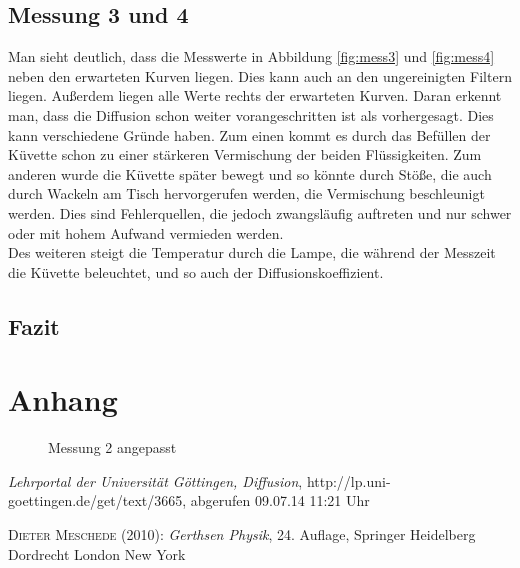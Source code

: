 \documentclass[12pt,a4paper,titlepage,headinclude,bibtotoc]{scrartcl}
\begin{document}
\subsection{Messung 3 und 4}
Man sieht deutlich, dass die Messwerte in Abbildung \ref{fig:mess3} und \ref{fig:mess4} neben den erwarteten Kurven liegen.
Dies kann auch an den ungereinigten Filtern liegen.
Außerdem liegen alle Werte rechts der erwarteten Kurven.
Daran erkennt man, dass die Diffusion schon weiter vorangeschritten ist als vorhergesagt.
Dies kann verschiedene Gründe haben.
Zum einen kommt es durch das Befüllen der Küvette schon zu einer stärkeren Vermischung der beiden Flüssigkeiten. 
Zum anderen wurde die Küvette später bewegt und so könnte durch Stöße, die auch durch Wackeln am Tisch hervorgerufen werden, die Vermischung beschleunigt werden.
Dies sind Fehlerquellen, die jedoch zwangsläufig auftreten und nur schwer oder mit hohem Aufwand vermieden werden.\\
Des weiteren steigt die Temperatur durch die Lampe, die während der Messzeit die Küvette beleuchtet, und so auch der Diffusionskoeffizient.

\subsection{Fazit}

\section{Anhang}
\begin{figure}
	\centering
	
	\caption{Messung 2 angepasst}
	\label{fig:DiffDisk}
\end{figure}

\begin{thebibliography}{100}

	\emph{Lehrportal der Universität Göttingen, Diffusion},
  http://lp.uni-goettingen.de/get/text/3665, abgerufen 09.07.14 11:21 Uhr

	\textsc{Dieter Meschede} (2010): \emph{Gerthsen Physik}, 24. Auflage, Springer Heidelberg
Dordrecht London New York

\end{thebibliography}
\end{document}
